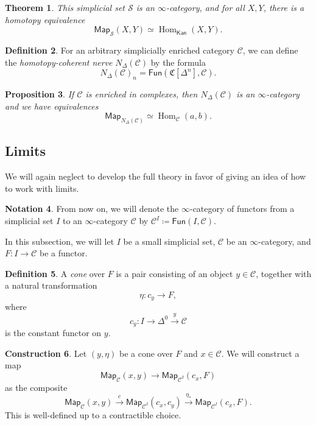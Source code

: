 \documentclass[10pt, oneside]{memoir}
\newtheorem{thm}{Theorem}[subsection]
\newtheorem{prop}[thm]{Proposition}
\theoremstyle{definition}
\newtheorem{defn}[thm]{Definition}
\newtheorem{con}[thm]{Construction}
\newtheorem{notn}[thm]{Notation}
\theoremstyle{remark}
\theoremstyle{plain}
\theoremstyle{definition}
\theoremstyle{remark}
\newcommand{\mc}[1]{\mathcal{#1}}
\newcommand{\mf}[1]{\mathfrak{#1}}
\newcommand{\ms}[1]{\mathsf{#1}}
\newcommand{\1}{\mathbf{1}}
\newcommand{\2}{\mathbf{2}}
\newcommand{\3}{\mathbf{3}}
\DeclareMathOperator{\Hom}{Hom}
\begin{document}
\begin{thm}
    This simplicial set \(\mc{S} \) is an \(\infty \)-category, and for all \(X, Y \), there is a homotopy equivalence
    \[ \ms{Map}_{\mc{S}}(X, Y) \simeq \Hom_{\ms{Kan}}(X, Y). \]
\end{thm}

\begin{defn}
    For an arbitrary simplicially enriched category \(\mc{C} \), we can define the \textit{homotopy-coherent nerve} \(N_{\Delta}(\mc{C}) \) by the formula
    \[ N_{\Delta}(\mc{C})_n = \ms{Fun}(\mf{C}[\Delta^n], \mc{C}). \]
\end{defn}

\begin{prop}
    If \(\mc{C} \) is enriched in complexes, then \(N_{\Delta}(\mc{C}) \) is an \(\infty \)-category and we have equivalences
    \[ \ms{Map}_{N_{\Delta}(\mc{C})} \simeq \Hom_{\mc{C}}(a,b). \]
\end{prop}

\subsection{Limits}%
\label{sub:Limits}

We will again neglect to develop the full theory in favor of giving an idea of how to work with limits.

\begin{notn}
    From now on, we will denote the \(\infty \)-category of functors from a simplicial set \(I \) to an \(\infty \)-category \(\mc{C} \) by \(\mc{C}^I \coloneqq \ms{Fun}(I, \mc{C}) \).
\end{notn}

In this subsection, we will let \(I \) be a small simplicial set, \(\mc{C} \) be an \(\infty \)-category, and \(F \colon I \to \mc{C} \) be a functor.

\begin{defn}
    A \textit{cone} over \(F \) is a pair consisting of an object \(y \in \mc{C} \), together with a natural transformation 
    \[ \eta \colon c_y \to F, \]
    where 
    \[ c_y \colon I \to \Delta^0 \xrightarrow{y} \mc{C} \]
    is the constant functor on \(y \).
\end{defn}

\begin{con}
    Let \((y, \eta) \) be a cone over \(F \) and \(x \in \mc{C} \). We will construct a map
    \[ \ms{Map}_{\mc{C}}(x,y) \to \ms{Map}_{\mc{C}^I} (c_x, F) \]
    as the composite
    \[ \ms{Map}_{\mc{C}}(x,y) \xrightarrow{c} \ms{Map}_{\mc{C}^I} (c_x, c_y) \xrightarrow{\eta_*} \ms{Map}_{\mc{C}^I} (c_x, F). \]
    This is well-defined up to a contractible choice.
\end{con}
\end{document}
